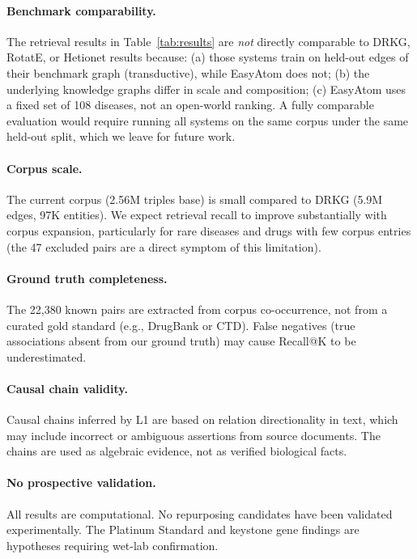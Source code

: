 \documentclass[11pt]{article}
\begin{document}
\paragraph{Benchmark comparability.}
The retrieval results in Table~\ref{tab:results} are \emph{not}
directly comparable to DRKG, RotatE, or Hetionet results because:
(a) those systems train on held-out edges of their benchmark graph
(transductive), while EasyAtom does not;
(b) the underlying knowledge graphs differ in scale and composition;
(c) EasyAtom uses a fixed set of 108 diseases, not an open-world ranking.
A fully comparable evaluation would require running all systems on
the same corpus under the same held-out split, which we leave for
future work.

\paragraph{Corpus scale.}
The current corpus (2.56M triples base) is small compared to DRKG
(5.9M edges, 97K entities).
We expect retrieval recall to improve substantially with corpus
expansion, particularly for rare diseases and drugs with
few corpus entries (the 47 excluded pairs are a direct symptom of
this limitation).

\paragraph{Ground truth completeness.}
The 22,380 known pairs are extracted from corpus co-occurrence,
not from a curated gold standard (e.g., DrugBank or CTD).
False negatives (true associations absent from our ground truth)
may cause Recall@K to be underestimated.

\paragraph{Causal chain validity.}
Causal chains inferred by L1 are based on relation directionality
in text, which may include incorrect or ambiguous assertions
from source documents.
The chains are used as algebraic evidence, not as verified
biological facts.

\paragraph{No prospective validation.}
All results are computational.
No repurposing candidates have been validated experimentally.
The Platinum Standard and keystone gene findings are hypotheses
requiring wet-lab confirmation.
\end{document}
